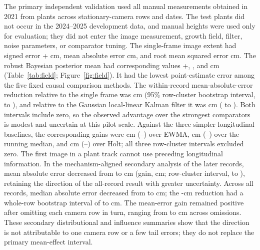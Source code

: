 \documentclass[12pt,letterpaper]{article}
\begin{document}
The primary independent validation used all \FieldN{} manual measurements obtained in 2021 from \FieldPlants{} plants across \FieldRows{} stationary-camera rows and \FieldDates{} dates. The test plants did not occur in the 2024--2025 development data, and manual heights were used only for evaluation; they did not enter the image measurement, growth field, filter, noise parameters, or comparator tuning. The single-frame image extent had signed error +\FieldSingleBias{} cm, mean absolute error \FieldSingleMAE{} cm, and root mean squared error \FieldSingleRMSE{} cm. The robust Bayesian posterior mean had corresponding values +\FieldBayesBias{}, \FieldBayesMAE{}, and \FieldBayesRMSE{} cm (Table~\ref{tab:field}; Figure~\ref{fig:field}). It had the lowest point-estimate error among the five fixed causal comparison methods. The within-record mean-absolute-error reduction relative to the single frame was \FieldMAEGain{} cm (95\% row-cluster bootstrap interval, \FieldMAEGainLo{} to \FieldMAEGainHi{}), and relative to the Gaussian local-linear Kalman filter it was \FieldGaussianGain{} cm (\FieldGaussianGainLo{} to \FieldGaussianGainHi{}). Both intervals include zero, so the observed advantage over the strongest comparators is modest and uncertain at this pilot scale. Against the three simpler longitudinal baselines, the corresponding gains were \FieldEWMAGain{} cm (\FieldEWMAGainLo{}--\FieldEWMAGainHi{}) over EWMA, \FieldMedianGain{} cm (\FieldMedianGainLo{}--\FieldMedianGainHi{}) over the running median, and \FieldHoltGain{} cm (\FieldHoltGainLo{}--\FieldHoltGainHi{}) over Holt; all three row-cluster intervals excluded zero. The first image in a plant track cannot use preceding longitudinal information. In the mechanism-aligned secondary analysis of the \FieldAfterFirstN{} later records, mean absolute error decreased from \FieldAfterFirstSingleMAE{} to \FieldAfterFirstBayesMAE{} cm (gain, \FieldAfterFirstGain{} cm; row-cluster interval, \FieldAfterFirstGainLo{} to \FieldAfterFirstGainHi{}), retaining the direction of the all-record result with greater uncertainty. Across all records, median absolute error decreased from \FieldMedianErrorSingle{} to \FieldMedianErrorBayes{} cm; the \FieldMedianErrorGain{}-cm reduction had a whole-row bootstrap interval of \FieldMedianErrorGainLo{} to \FieldMedianErrorGainHi{} cm. The mean-error gain remained positive after omitting each camera row in turn, ranging from \FieldLeaveOneRowOutMinGain{} to \FieldLeaveOneRowOutMaxGain{} cm across \FieldLeaveOneRowOutN{} omissions. These secondary distributional and influence summaries show that the direction is not attributable to one camera row or a few tail errors; they do not replace the primary mean-effect interval.
\end{document}
